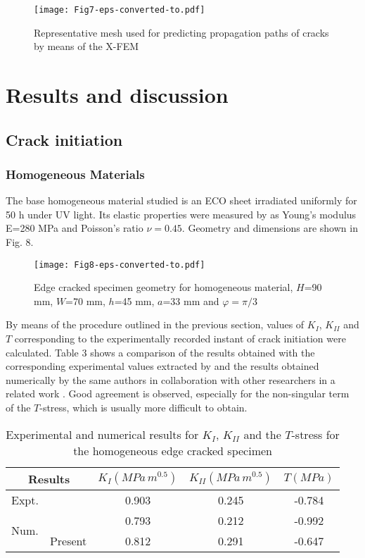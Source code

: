 \begin{figure}[H]
\centering
\texttt{[image: Fig7-eps-converted-to.pdf]}
\caption{Representative mesh used for predicting propagation paths of cracks by means of the X-FEM}
\label{fig:Fig7}
\end{figure}

\section{Results and discussion}
\label{}

\subsection{Crack initiation}

\subsubsection{Homogeneous Materials}

The base homogeneous material studied is an ECO sheet irradiated uniformly for 50 h under UV light. Its elastic properties were measured by \cite{Abanto-Bueno2006} as Young's modulus E=280 MPa and Poisson's ratio $\nu=0.45$. Geometry and dimensions are shown in Fig. 8.

\begin{figure}[htbp]
\centering
\texttt{[image: Fig8-eps-converted-to.pdf]}
\caption{Edge cracked specimen geometry for homogeneous material, $H$=90 mm, $W$=70 mm, $h$=45 mm, $a$=33 mm and $\varphi=\pi/3$}
\label{fig:Fig8}
\end{figure}

By means of the procedure outlined in the previous section, values of $K_I$, $K_{II}$ and $T$ corresponding to the experimentally recorded instant of crack initiation were calculated. Table 3 shows a comparison of the results obtained with the corresponding experimental values extracted by \cite{Abanto-Bueno2006} and the results obtained numerically by the same authors in collaboration with other researchers in a related work \citep{Oral2008}. Good agreement is observed, especially for the non-singular term of the $T$-stress, which is usually more difficult to obtain.

\begin{table*}[!ht]
\caption{Experimental and numerical results for $K_I$, $K_{II}$ and the $T$-stress for the homogeneous edge cracked specimen}
\centering
\begin{tabular}{c c c c c} 
\hline \hline
 \multicolumn{2}{c}{Results} & $K_I (M\!Pa\,m^{0.5})$ & $K_{II} (M\!Pa\,m^{0.5})$ & $T (M\!Pa)$\\
 \hline
 Expt. & \cite{Abanto-Bueno2006} & 0.903 & 0.245 & -0.784 \\
 \multirow{2}{*}{Num.} & \cite{Oral2008} & 0.793 & 0.212 & -0.992\\
 & Present & 0.812 & 0.291 & -0.647\\ 
 \hline \hline 
\end{tabular}
\label{tab:Table3}
\end{table*}

